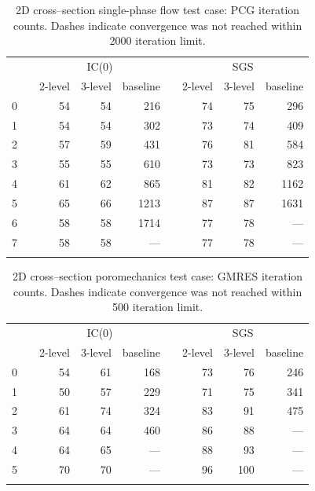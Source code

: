 \begin{table}
    \centering
    \caption{2D cross--section single-phase flow test case: PCG iteration counts.   Dashes indicate convergence was not reached within 2000 iteration limit.}
    \label{tab:cross_section_conv_flow}
    \begin{tabular}{rrrrrrrrr}
        \hline\noalign{\smallskip}
        \multirow{2}{*}{$\ell$} & & \multicolumn{3}{c}{IC(0)} & & \multicolumn{3}{c}{SGS} \\
        \noalign{\smallskip}\cline{3-5} \cline{7-9}\noalign{\smallskip}
        & & 2-level & 3-level & baseline & & 2-level & 3-level & baseline \\
        \hline\noalign{\smallskip}
        0 & & 54 & 54 &  216 & & 74 & 75 &  296 \\
        1 & & 54 & 54 &  302 & & 73 & 74 &  409 \\
        2 & & 57 & 59 &  431 & & 76 & 81 &  584 \\
        3 & & 55 & 55 &  610 & & 73 & 73 &  823 \\
        4 & & 61 & 62 &  865 & & 81 & 82 & 1162 \\
        5 & & 65 & 66 & 1213 & & 87 & 87 & 1631 \\
        6 & & 58 & 58 & 1714 & & 77 & 78 &  --- \\
        7 & & 58 & 58 &  --- & & 77 & 78 &  --- \\
        \hline\noalign{\smallskip}
    \end{tabular}
\end{table}

\begin{table}
    \centering
    \caption{2D cross--section poromechanics test case: GMRES iteration counts.   Dashes indicate convergence was not reached within 500 iteration limit.}
    \label{tab:cross_section_conv_poro}
    \begin{tabular}{rrrrrrrrr}
        \hline\noalign{\smallskip}
        \multirow{2}{*}{$\ell$} & & \multicolumn{3}{c}{IC(0)} & & \multicolumn{3}{c}{SGS} \\
        \noalign{\smallskip}\cline{3-5} \cline{7-9}\noalign{\smallskip}
        & & 2-level & 3-level & baseline & & 2-level & 3-level & baseline \\
        \hline\noalign{\smallskip}
        0 & & 54 & 61 & 168 & & 73 &  76 & 246 \\
        1 & & 50 & 57 & 229 & & 71 &  75 & 341 \\
        2 & & 61 & 74 & 324 & & 83 &  91 & 475 \\
        3 & & 64 & 64 & 460 & & 86 &  88 & --- \\
        4 & & 64 & 65 & --- & & 88 &  93 & --- \\
        5 & & 70 & 70 & --- & & 96 & 100 & --- \\
        \hline\noalign{\smallskip}
    \end{tabular}
\end{table}

